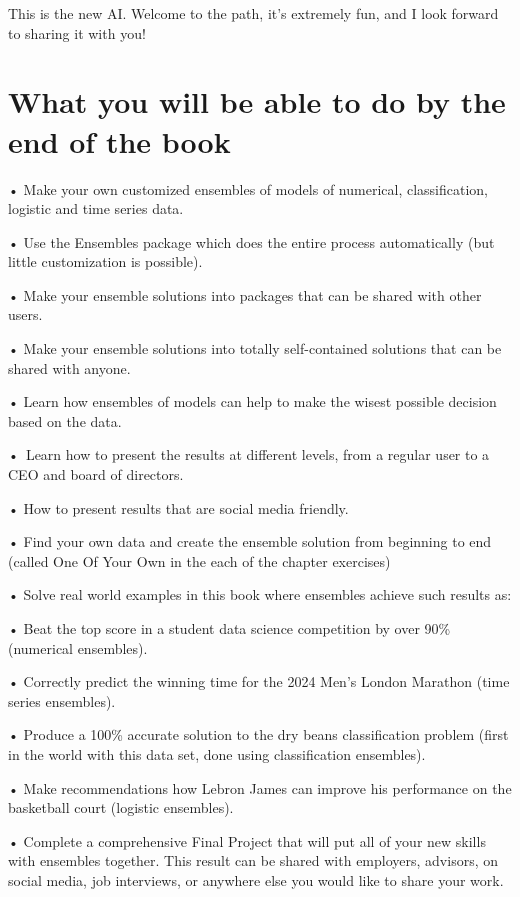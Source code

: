 \documentclass[
]{book}
\begin{document}
This is the new AI. Welcome to the path, it's extremely fun, and I look forward to sharing it with you!

\section{What you will be able to do by the end of the book}\label{what-you-will-be-able-to-do-by-the-end-of-the-book}

• Make your own customized ensembles of models of numerical, classification, logistic and time series data.

• Use the Ensembles package which does the entire process automatically (but little customization is possible).

• Make your ensemble solutions into packages that can be shared with other users.

• Make your ensemble solutions into totally self-contained solutions that can be shared with anyone.

• Learn how ensembles of models can help to make the wisest possible decision based on the data.

•~Learn how to present the results at different levels, from a regular user to a CEO and board of directors.

• How to present results that are social media friendly.

• Find your own data and create the ensemble solution from beginning to end (called One Of Your Own in the each of the chapter exercises)

• Solve real world examples in this book where ensembles achieve such results as:

• Beat the top score in a student data science competition by over 90\% (numerical ensembles).

• Correctly predict the winning time for the 2024 Men's London Marathon (time series ensembles).

• Produce a 100\% accurate solution to the dry beans classification problem (first in the world with this data set, done using classification ensembles).

• Make recommendations how Lebron James can improve his performance on the basketball court (logistic ensembles).

• Complete a comprehensive Final Project that will put all of your new skills with ensembles together. This result can be shared with employers, advisors, on social media, job interviews, or anywhere else you would like to share your work.
\end{document}
